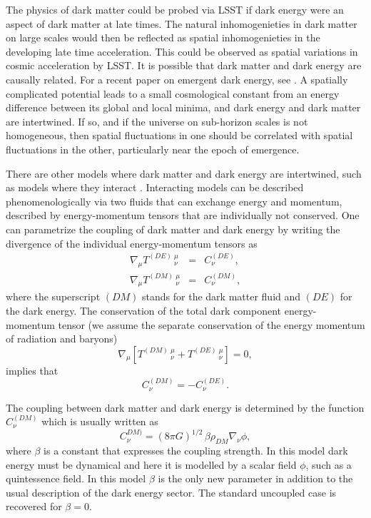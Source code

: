 \documentclass[modern,linenumbers]{aastex62}
\begin{document}
The physics of dark matter could be probed via LSST if dark energy were an aspect of dark matter at late times. 
The natural inhomogenieties in dark matter on large scales would then be reflected as spatial inhomogenieties in the developing late time acceleration. 
This could be observed as spatial variations in cosmic acceleration by LSST. 
It is possible that dark matter and dark energy are causally related. 
For a recent paper on emergent dark energy, see \cite{1801.09658}. 
A spatially complicated potential leads to a small cosmological constant from an energy difference between its global and local minima, and dark energy and dark matter are intertwined. 
If so, and if the universe on sub-horizon scales is not homogeneous, then spatial fluctuations in one should be correlated with spatial fluctuations in the other, particularly near the epoch of emergence.

There are other models where dark matter and dark energy are intertwined, such as models where they interact 
\citep{Amendola:1999er,Holden:1999hm}.
Interacting models can be described phenomenologically via two fluids that can exchange energy and momentum, 
described by energy-momentum tensors that are individually not conserved. One can parametrize the coupling of
dark matter and dark energy by writing the divergence of the individual energy-momentum tensors as 
\begin{eqnarray}
\nabla_{\mu} T^{(DE)}\,^{\mu}_{\nu} &=& C^{(DE)}_{\nu}, \label{cons_phi} \\
\nabla_{\mu} T^{(DM)}\,^{\mu}_{\nu} &=& C^{(DM)}_{\nu}, \label{cons_dm}
\end{eqnarray}
where the superscript $(DM)$ stands for the dark matter fluid and $(DE)$ for the dark energy.
The conservation of the total dark component energy-momentum tensor 
(we assume the separate conservation of the energy momentum of radiation and baryons)
\begin{equation}
\label{energyconservation}
\nabla_{\mu} \left[ T^{(DM)} \,^{\mu}_{\nu} + T^{(DE)} \,^{\mu}_{\nu} \right]= 0,
\end{equation}
implies that
\begin{equation}
C^{(DM)}_{\nu}=-C^{(DE)}_{\nu}.
\end{equation}

The coupling between dark matter and dark energy is determined by the function $C^{(DM)}_{\nu}$ which is usually
written as
\begin{equation}
C^{DM)}_{\nu} = (8\pi G)^{1/2} \,\beta\rho_{DM}\nabla_{\nu} \phi,
\end{equation}
where $\beta$ is a constant that expresses the coupling strength. In this model dark energy must be dynamical and here it is modelled by a scalar field  $\phi$, such as a quintessence field.
In this model $\beta$ is the only new parameter in addition to the usual description of the dark energy sector.
The standard uncoupled case is recovered for $\beta=0$.
\end{document}
